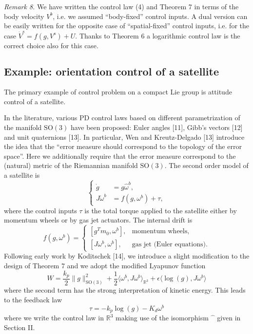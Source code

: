 \documentclass[10pt,twocolumn]{article}
\newcommand{\SO}{\mathrm{SO}}
\newcommand{\R}{\mathbb R}
\newcommand{\paperhead}[2]{\par\medskip\noindent\textit{#1} #2\par}
\begin{document}
\paperhead{Remark 8.}{We have written the control law (4) and Theorem 7 in terms of the body velocity $V^b$, i.e. we assumed ``body-fixed'' control inputs. A dual version can be easily written for the opposite case of ``spatial-fixed'' control inputs, i.e. for the case $\dot V^s=f(g,V^s)+U$. Thanks to Theorem 6 a logarithmic control law is the correct choice also for this case.}

\subsection{Example: orientation control of a satellite}
The primary example of control problem on a compact Lie group is attitude control of a satellite.

In the literature, various PD control laws based on different parametrization of the manifold $\SO(3)$ have been proposed: Euler angles [11], Gibb's vectors [12] and unit quaternions [13]. In particular, Wen and Kreutz-Delgado [13] introduce the idea that the ``error measure should correspond to the topology of the error space''. Here we additionally require that the error measure correspond to the (natural) metric of the Riemannian manifold $\SO(3)$. The second order model of a satellite is
\begin{equation*}
\left\{\begin{aligned}
\dot g&=g\widehat\omega^b,\\
J\dot\omega^b&=f(g,\omega^b)+\tau,
\end{aligned}\right.
\end{equation*}
where the control inputs $\tau$ is the total torque applied to the satellite either by momentum wheels or by gas jet actuators. The internal drift is
\begin{equation*}
f(g,\omega^b)=
\begin{cases}
[g^Tm_0,\omega^b],&\text{momentum wheels},\\
[J\omega^b,\omega^b],&\text{gas jet (Euler equations)}.
\end{cases}
\end{equation*}
Following early work by Koditschek [14], we introduce a slight modification to the design of Theorem 7 and we adopt the modified Lyapunov function
\begin{equation*}
W=\frac{k_p}{2}\|g\|_{\SO(3)}^2+\frac12\langle\omega^b,J\omega^b\rangle_{\R^3}
+\epsilon\langle\log(g),J\omega^b\rangle
\end{equation*}
where the second term has the strong interpretation of kinetic energy. This leads to the feedback law
\begin{equation*}
\tau=-k_p\log(g)-K_d\omega^b\tag{7}
\end{equation*}
where we write the control law in $\R^3$ making use of the isomorphism $\widehat{\phantom{x}}$ given in Section II.
\end{document}
